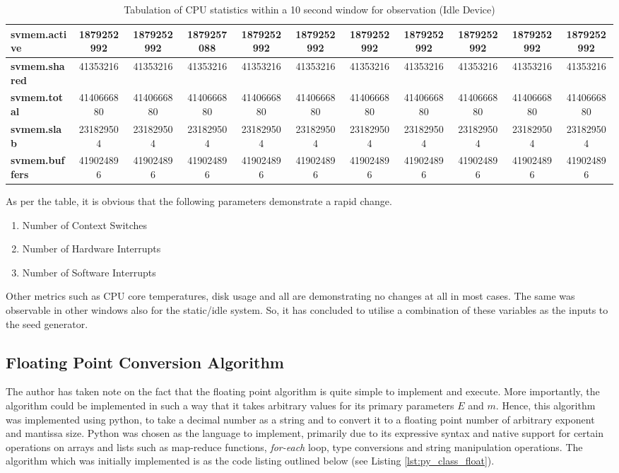 \begin{sidewaystable}[h]
{\begin{tabular}{|l|c|c|c|c|c|c|c|c|c|c|}
        \textbf{svmem.active} & 1879252992 & 1879252992 & 1879257088 & 1879252992 & 1879252992 & 1879252992 & 1879252992 & 1879252992 & 1879252992 & 1879252992 \\ \hline
        \textbf{svmem.shared} & 41353216 & 41353216 & 41353216 & 41353216 & 41353216 & 41353216 & 41353216 & 41353216 & 41353216 & 41353216 \\ \hline
        \textbf{svmem.total} & 4140666880 & 4140666880 & 4140666880 & 4140666880 & 4140666880 & 4140666880 & 4140666880 & 4140666880 & 4140666880 & 4140666880 \\ \hline
        \textbf{svmem.slab} & 231829504 & 231829504 & 231829504 & 231829504 & 231829504 & 231829504 & 231829504 & 231829504 & 231829504 & 231829504 \\ \hline
        \textbf{svmem.buffers} & 419024896 & 419024896 & 419024896 & 419024896 & 419024896 & 419024896 & 419024896 & 419024896 & 419024896 & 419024896 \\ \hline
    \end{tabular}}
    \caption{Tabulation of CPU statistics within a 10 second window for observation (Idle Device)}
        \label{tab:c4_ten_sec_cpu_dat_idle}
\end{sidewaystable}

As per the table, it is obvious that the following parameters demonstrate a rapid change.

\begin{enumerate}
    \item Number of Context Switches
    \item Number of Hardware Interrupts
    \item Number of Software Interrupts
\end{enumerate}

Other metrics such as CPU core temperatures, disk usage and all are demonstrating no changes at all in most cases. The same was observable in other windows also for the static/idle system. So, it has concluded to utilise a combination of these variables as the inputs to the seed generator.

\newpage

\subsection{Floating Point Conversion Algorithm}
The author has taken note on the fact that the floating point algorithm is quite simple to implement and execute. More importantly, the algorithm could be implemented in such a way that it takes arbitrary values for its primary parameters $E$ and $m$. Hence, this algorithm was implemented using python, to take a decimal number as a string and to convert it to a floating point number of arbitrary exponent and mantissa size. Python was chosen as the language to implement, primarily due to its expressive syntax and native support for certain operations on arrays and lists such as map-reduce functions, \textit{for-each} loop, type conversions and string manipulation operations. The algorithm which was initially implemented is as the code listing outlined below (see Listing \ref{lst:py_class_float}).

